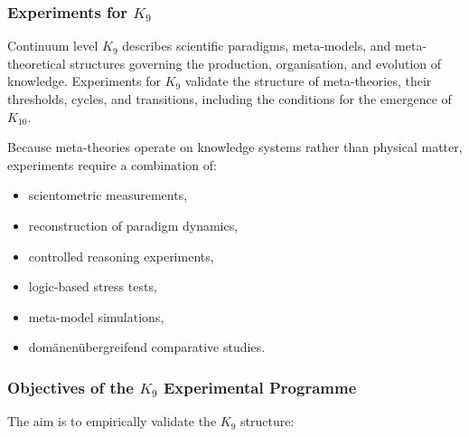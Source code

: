 
\subsubsection{Experiments for \texorpdfstring{$K_9$}{K_9}}
\label{sec:experiments-k9}

Continuum level $K_9$ describes scientific paradigms, 
meta-models, and meta-theoretical structures governing the 
production, organisation, and evolution of knowledge.  
Experiments for $K_9$ validate the structure of meta-theories,
their thresholds, cycles, and transitions, including the
conditions for the emergence of $K_{10}$.

Because meta-theories operate on knowledge systems rather than 
physical matter, experiments require a combination of:

\begin{itemize}
    \item scientometric measurements,
    \item reconstruction of paradigm dynamics,
    \item controlled reasoning experiments,
    \item logic-based stress tests,
    \item meta-model simulations,
    \item domänenübergreifend comparative studies.
\end{itemize}



\subsubsection{Objectives of the \texorpdfstring{$K_9$}{K_9} Experimental Programme}

The aim is to empirically validate the $K_9$ structure:

